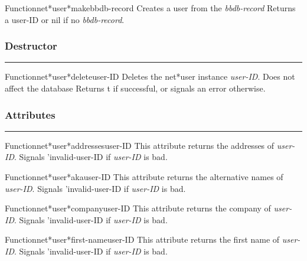 \begin{functiondoc}{Function}{net*user*make}{bbdb-record}
Creates a user from the {\em bbdb-record}
Returns a user-ID or nil if no {\em bbdb-record}.
\end{functiondoc}


\subsubsection*{Destructor}
\par\vspace*{0.00in}\par\hrule\par\medskip\par


\begin{functiondoc}{Function}{net*user*delete}{user-ID}
Deletes the net*user instance {\em user-ID}.  Does not affect the database
Returns t if successful, or signals an error otherwise.
\end{functiondoc}


\subsubsection*{Attributes}
\par\vspace*{0.00in}\par\hrule\par\medskip\par


\begin{functiondoc}{Function}{net*user*addresses}{user-ID}
This attribute returns the addresses of {\em user-ID}.
Signals 'invalid-user-ID if {\em user-ID} is bad.
\end{functiondoc}

\begin{functiondoc}{Function}{net*user*aka}{user-ID}
This attribute returns the alternative names of {\em user-ID}.
Signals 'invalid-user-ID if {\em user-ID} is bad.
\end{functiondoc}

\begin{functiondoc}{Function}{net*user*company}{user-ID}
This attribute returns the company of {\em user-ID}.
Signals 'invalid-user-ID if {\em user-ID} is bad.
\end{functiondoc}

\begin{functiondoc}{Function}{net*user*first-name}{user-ID}
This attribute returns the first name of {\em user-ID}.
Signals 'invalid-user-ID if {\em user-ID} is bad.
\end{functiondoc}

